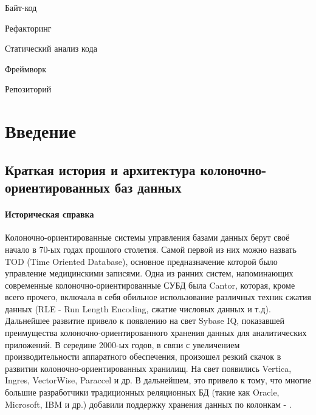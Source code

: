 \documentclass{matmex-diploma}
\begin{document}
    Байт-код
    
    Рефакторинг
    
    Статический анализ кода
    
    Фреймворк
    
    Репозиторий
    
\section*{Введение}
    \subsection{Краткая история и архитектура колоночно-ориентированных баз данных}
        \paragraph{Историческая справка}
            Колоночно-ориентированные системы управления базами данных берут своё начало в 70-ых годах прошлого столетия. Самой первой из них можно назвать TOD (Time Oriented Database), основное предназначение которой было управление медицинскими записями. Одна из ранних систем, напоминающих современные колоночно-ориентированные СУБД была Cantor, которая, кроме всего прочего, включала в себя обильное использование различных техник сжатия данных (RLE - Run Length Encoding, сжатие числовых данных и т.д). Дальнейшее развитие привело к появлению на свет Sybase IQ, показавшей преимущества колоночно-ориентированного хранения данных для аналитических приложений. В середине 2000-ых годов, в связи с увеличением производительности аппаратного обеспечения, произошел резкий скачок в развитии колоночно-ориентированных хранилищ. На свет появились Vertica, Ingres, VectorWise, Paraccel и др. В дальнейшем, это привело к тому, что многие большие разработчики традиционных реляционных БД (такие как Oracle, Microsoft, IBM и др.) добавили поддержку хранения данных по колонкам - \cite{abadidesign}.
\end{document}
